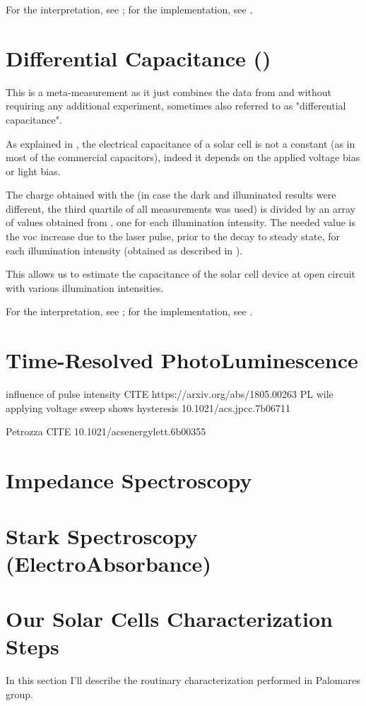 For the interpretation, see ; for the implementation, see .

\section{Differential Capacitance ()}

This is a meta-measurement as it just combines the data from  and  without requiring any additional experiment\cite{Shuttle2008}, sometimes also referred to as "differential capacitance".

As explained in , the electrical capacitance of a solar cell is not a constant (as in most of the commercial capacitors), indeed it depends on the applied voltage bias or light bias.

The charge obtained with the  (in case the dark and illuminated results were different, the third quartile of all  measurements was used) is divided by an array of values obtained from , one for each illumination intensity. The needed value is the \gls{voc} increase due to the laser pulse, prior to the decay to steady state, for each illumination intensity (obtained as described in ).

This allows us to estimate the capacitance of the solar cell device at open circuit with various illumination intensities.

For the interpretation, see ; for the implementation, see .


\section{Time-Resolved PhotoLuminescence}
influence of pulse intensity CITE https://arxiv.org/abs/1805.00263
PL wile applying voltage sweep shows hysteresis 10.1021/acs.jpcc.7b06711

Petrozza CITE 10.1021/acsenergylett.6b00355


\section{Impedance Spectroscopy}

\section{Stark Spectroscopy (ElectroAbsorbance)}

\section{Our Solar Cells Characterization Steps}

In this section I'll describe the routinary characterization performed in Palomares group.


